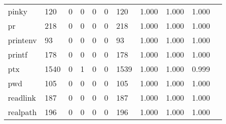 \begin{longtable}{lp{1.10cm}p{1.10cm}p{1.10cm}p{1.10cm}p{1.10cm}p{1.10cm}p{1.10cm}p{1.10cm}p{1.10cm}p{1.10cm}}
pinky     &                    120 &                                  0 &                                 0 &                                0 &                                 0 &                             120 &                          1.000 &                                 1.000 &                               1.000 \\
pr        &                    218 &                                  0 &                                 0 &                                0 &                                 0 &                             218 &                          1.000 &                                 1.000 &                               1.000 \\
printenv  &                     93 &                                  0 &                                 0 &                                0 &                                 0 &                              93 &                          1.000 &                                 1.000 &                               1.000 \\
printf    &                    178 &                                  0 &                                 0 &                                0 &                                 0 &                             178 &                          1.000 &                                 1.000 &                               1.000 \\
ptx       &                   1540 &                                  0 &                                 1 &                                0 &                                 0 &                            1539 &                          1.000 &                                 1.000 &                               0.999 \\
pwd       &                    105 &                                  0 &                                 0 &                                0 &                                 0 &                             105 &                          1.000 &                                 1.000 &                               1.000 \\
readlink  &                    187 &                                  0 &                                 0 &                                0 &                                 0 &                             187 &                          1.000 &                                 1.000 &                               1.000 \\
realpath  &                    196 &                                  0 &                                 0 &                                0 &                                 0 &                             196 &                          1.000 &                                 1.000 &                               1.000 \\

\end{longtable}

